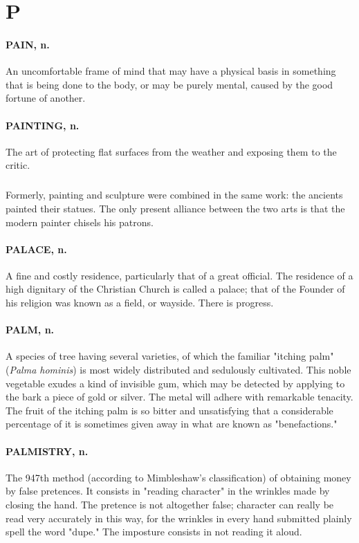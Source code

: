 \documentclass[11pt]{article}
\begin{document}
\section*{P}



\paragraph{PAIN, n.}  An uncomfortable frame of mind that may have a physical
basis in something that is being done to the body, or may be purely
mental, caused by the good fortune of another.

\paragraph{PAINTING, n.}  The art of protecting flat surfaces from the weather and
exposing them to the critic.
\subparagraph{}   Formerly, painting and sculpture were combined in the same work:
the ancients painted their statues.  The only present alliance between
the two arts is that the modern painter chisels his patrons.

\paragraph{PALACE, n.}  A fine and costly residence, particularly that of a great
official.  The residence of a high dignitary of the Christian Church
is called a palace; that of the Founder of his religion was known as a
field, or wayside.  There is progress.

\paragraph{PALM, n.}  A species of tree having several varieties, of which the
familiar "itching palm" ({\em Palma hominis}) is most widely distributed
and sedulously cultivated.  This noble vegetable exudes a kind of
invisible gum, which may be detected by applying to the bark a piece
of gold or silver.  The metal will adhere with remarkable tenacity.
The fruit of the itching palm is so bitter and unsatisfying that a
considerable percentage of it is sometimes given away in what are known
as "benefactions."

\paragraph{PALMISTRY, n.}  The 947th method (according to Mimbleshaw's
classification) of obtaining money by false pretences.  It consists in
"reading character" in the wrinkles made by closing the hand.  The
pretence is not altogether false; character can really be read very
accurately in this way, for the wrinkles in every hand submitted
plainly spell the word "dupe."  The imposture consists in not reading
it aloud.
\end{document}
